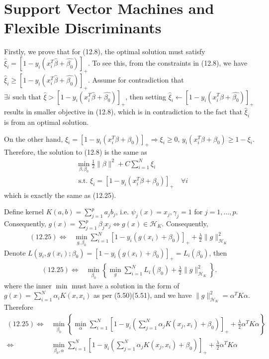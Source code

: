 \chapter{Support Vector Machines and Flexible Discriminants}
\label{ch:12}

\begin{exercise}
  Firstly, we prove that for (12.8), the optimal solution must satisfy 
  $\hat{\xi}_i = [1-y_i(x_i^ T\hat{\beta} + \hat{\beta_0})]_+$. To see this,
  from the constraints in (12.8), we have $\hat{\xi}_i \geq [1-y_i(x_i^
  T\hat{\beta} + \hat{\beta_0})]_+$. Assume for contradiction that
  $\exists i \mbox{ such that }\hat{\xi} > [1-y_i(x_i^ T\hat{\beta} +
  \hat{\beta_0})]_+$, then setting $\hat{\xi}_i\leftarrow [1-y_i(x_i^
  T\hat{\beta} + \hat{\beta_0})]_+$ results in smaller objective in (12.8),
  which is in contradiction to the fact that $\hat{\xi}_i$ is from an optimal
  solution.
  
  On the other hand, $\xi_i = [1-y_i(x_i^ T\beta + \beta_0)]_+ \Rightarrow
  \xi_i\geq 0,\,y_i(x_i^ T\beta + \beta_0)\geq 1-\xi_i$. Therefore, the solution to (12.8) is the same as
  \begin{align}
    &{\min _{\beta, \beta_{0}} \frac{1}{2}\|\beta\|^{2}+C \sum_{i=1}^{N} \xi_{i}} \\ 
    &{\text { s.t. } \xi_{i}=\left[1-y_{i}\left(x_{i}^{T} \beta+\beta_{0}\right)\right]_+\quad \forall i}
  \end{align}
  which is exactly the same as (12.25).
\end{exercise}

\begin{exercise}
  \label{ex:12_2}
  Define kernel $K(a, b) = \sum_{j=1}^pa_jb_j$, i.e. $\psi_j(x) = x_j,
  \gamma_j=1$ for $j = 1,\ldots,p$. Consequently, $g(x) =
  \sum_{j=1}^p\beta_jx_j \Leftrightarrow g(x)\in\mathcal{H}_K$. Consequently, 
  \begin{align}
    (12.25) \Leftrightarrow &\min_{g,\beta_0}\sum_{i=1}^N [1-y_i(g(x_i) +
    \beta_0)]_+ + \frac{\lambda}{2} \|g\|_{\mathcal{H}_K}^2
  \end{align}
  Denote $L(y_i, g(x_i);\beta_0) = [1-y_i(g(x_i) + \beta_0)]_+ = L_i(\beta_0)$,
  then
  \begin{align}
    (12.25) \Leftrightarrow & \min_{\beta_0}\left\{\min_{g}\sum_{i=1}^N
    L_i(\beta_0) + \frac{\lambda}{2} \|g\|_{\mathcal{H}_K}^2 \right\}.
  \end{align}
  where the inner $\min$ must have a solution in the form of
  $g(x)=\sum_{i=1}^N\alpha_iK(x, x_i)$ as per (5.50)(5.51), and we have
  $\|g\|_{\mathcal{H}_K}^2 = \alpha^TK\alpha$. Therefore
  \begin{align}
    (12.25) \Leftrightarrow & \min_{\beta_0}\left\{\min_{\alpha}\sum_{i=1}^N
    [1-y_i(\sum_{j=1}^N\alpha_jK(x_j, x_i)+ \beta_0)]_+ + \frac{\lambda}{2}
    \alpha^TK\alpha \right\} \\ 
    \Leftrightarrow & \min_{\beta_0, \alpha}\sum_{i=1}^N
    [1-y_i(\sum_{j=1}^N\alpha_jK(x_j, x_i)+ \beta_0)]_+ + \frac{\lambda}{2}
    \alpha^TK\alpha 
  \end{align}
\end{exercise}

